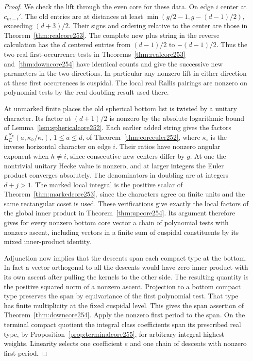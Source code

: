 \documentclass[a4paper,11pt]{article}
\theoremstyle{definition}
\theoremstyle{remark}
\numberwithin{equation}{section}
\begin{document}
\begin{proof}
We check the lift through the even core for these data.
On edge \(i\) center at \(c_{m-i}'\). The old entries are at
distances at least \(\min(g/2-1,g-(d-1)/2)\), exceeding
\((d+3)/2\). Their signs and ordering relative to the center
are those in Theorem~\ref{thm:realcore253}. The complete new
plus string in the reverse calculation has the \(d\) centered
entries from \((d-1)/2\) to \(-(d-1)/2\). Thus the two real
first-occurrence tests in Theorems~\ref{thm:realcore253}
and~\ref{thm:downcore254} have identical counts and give the
successive new parameters in the two directions. In particular
any nonzero lift in either direction at these first occurrences
is cuspidal. The local real Rallis pairings are nonzero on
polynomial tests by the real doubling result used there.

At unmarked finite places the old spherical bottom list is
twisted by a unitary character. Its factor at \((d+1)/2\)
is nonzero by the absolute logarithmic bound of
Lemma~\ref{lem:sphericalcore252}. Each earlier added string
gives the factors \(L_E^{S_E}(a,\kappa_h/\kappa_i)\),
\(1\le a\le d\), of Theorem~\ref{thm:coreeuler252},
where \(\kappa_i\) is the inverse horizontal character on edge
\(i\). Their ratios have nonzero angular exponent when \(h\ne i\),
since consecutive new centers differ by \(g\). At one the
nontrivial unitary Hecke value is nonzero, and at larger integers
the Euler product converges absolutely. The denominators in
doubling are at integers \(d+j>1\). The marked local integral
is the positive scalar of Theorem~\ref{thm:markedcore253},
since the characters agree on finite units and the same
rectangular coset is used. These verifications give exactly the
local factors of the global inner product in
Theorem~\ref{thm:upcore254}. Its argument therefore gives for
every nonzero bottom core vector a chain of polynomial tests
with nonzero ascent, including vectors in a finite sum of
cuspidal constituents by its mixed inner-product identity.

Adjunction now implies that the descents span each compact
type at the bottom. In fact a vector orthogonal to all the
descents would have zero inner product with its own ascent
after pulling the kernels to the other side. The resulting
quantity is the positive squared norm of a nonzero ascent.
Projection to a bottom compact type preserves the span by
equivariance of the first polynomial test. That type has
finite multiplicity at the fixed cuspidal level. This gives
the span assertion of Theorem~\ref{thm:downcore254}. Apply
the nonzero first period to the span. On the terminal compact
quotient the integral class coefficients span its prescribed
real type, by Proposition~\ref{prop:terminalcore255}, for
arbitrary integral highest weights. Linearity selects one
coefficient \(e\) and one chain of descents with nonzero
first period.


\end{proof}
\end{document}

